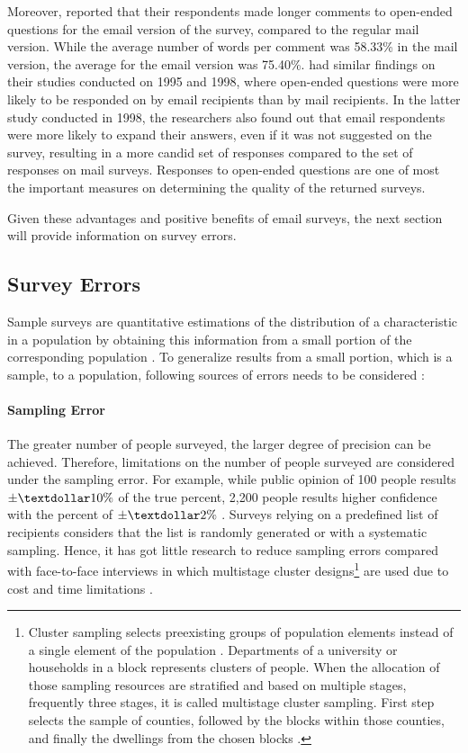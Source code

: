 Moreover, \cite{Paolo2009} reported that their respondents made longer comments to open-ended questions for the email version of the survey, compared to the regular mail version. While the average number of words per comment was 58.33\% in the mail version, the average for the email version was 75.40\%. \cite{BachmannD.ElfrinkJ.&Vazzana1999} had similar findings on their studies conducted on 1995 and 1998, where open-ended questions were more likely to be responded on by email recipients than by mail recipients. In the latter study conducted in 1998, the researchers also found out that email respondents were more likely to expand their answers, even if it was not suggested on the survey, resulting in a more candid set of responses compared to the set of responses on mail surveys. Responses to open-ended questions are one of most the important measures on determining the quality of the returned surveys.
\vspace{1cm}

Given these advantages and positive benefits of email surveys, the next section will provide information on survey errors.

\subsection{Survey Errors}
\label{sec:2.1.2:SurErr}
Sample surveys are quantitative estimations of the distribution of a characteristic in a population by obtaining this information from a small portion of the corresponding population \citep{Dillman1991}. To generalize results from a small portion, which is a sample, to a population, following sources of errors needs to be considered \citetext{\citealp[page 9]{Dillman2006}; \citealp{Dillman1991}}:

\paragraph{Sampling Error}
The greater number of people surveyed, the larger degree of precision can be achieved. Therefore, limitations on the number of people surveyed are considered under the sampling error. For example, while public opinion of 100 people results \(\pm\textdollar10\%\) of the true percent, 2,200 people results higher confidence with the percent of \(\pm\textdollar2\%\) \citep[page 9]{Dillman2006}. Surveys relying on a predefined list of recipients considers that the list is randomly generated or with a systematic sampling. Hence, it has got little research to reduce sampling errors compared with face-to-face interviews in which multistage cluster designs\footnote{Cluster sampling selects preexisting groups of population elements instead of a single element of the population \citep[page 106]{Groves2009}. Departments of a university or households in a block represents clusters of people. When the allocation of those sampling resources are stratified and based on multiple stages, frequently three stages, it is called multistage cluster sampling. First step selects the sample of counties, followed by the blocks within those counties, and finally the dwellings from the chosen blocks \citep{Scott1969}.} are used due to cost and time limitations \citetext{\citealp[page 106]{Groves2009}; \citealp{Dillman1991}}.

